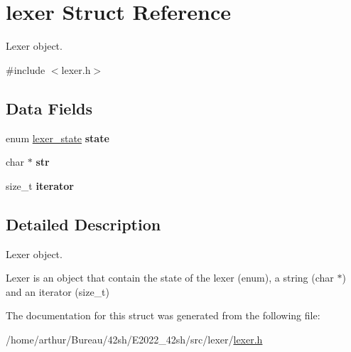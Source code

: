 \hypertarget{structlexer}{}\section{lexer Struct Reference}
\label{structlexer}


Lexer object.  




{\ttfamily \#include $<$lexer.\+h$>$}

\subsection*{Data Fields}
\begin{DoxyCompactItemize}
\item 
\mbox{\label{structlexer_ac9539f668ad50350e84f6fc241ebd03e}} 
enum \hyperlink{lexer_8h_a2e2153aea1d3d8930a7f9350827d64d8}{lexer\+\_\+state} {\bfseries state}
\item 
\mbox{\label{structlexer_ab50d783982593ef993ea0b68f7ad8b80}} 
char $\ast$ {\bfseries str}
\item 
\mbox{\label{structlexer_aca4ee50aaa0973d45b634fcd0d64e4ae}} 
size\+\_\+t {\bfseries iterator}
\end{DoxyCompactItemize}


\subsection{Detailed Description}
Lexer object. 

Lexer is an object that contain the state of the lexer (enum), a string (char $\ast$) and an iterator (size\+\_\+t) 

The documentation for this struct was generated from the following file\+:\begin{DoxyCompactItemize}
\item 
/home/arthur/\+Bureau/42sh/\+E2022\+\_\+42sh/src/lexer/\hyperlink{lexer_8h}{lexer.\+h}\end{DoxyCompactItemize}
